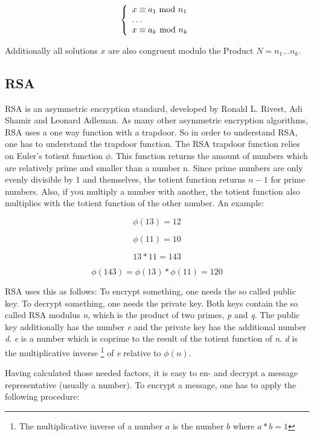 $$
\left\{
\begin{array}{l l l}
  x \equiv a_1 \ \text{mod}\ n_1 \\
  \ldots \\
  x \equiv a_k \ \text{mod}\ n_k
\end{array}
\right.
$$

Additionally all solutions $x$ are also congruent modulo the Product $N = n_1 \ldots n_k$.

\cite{ding1996chinese}

\subsection{RSA}
\label{sub_sec:rsa}
	
RSA is an asymmetric encryption standard, developed by Ronald L. Rivest, Adi Shamir and
Leonard Adleman. As many other asymmetric encryption algorithms, RSA uses a one way function
with a trapdoor. So in order to understand RSA, one has to understand the
trapdoor function. The RSA trapdoor function relies on Euler's totient function
$\phi$. This function returns the amount of numbers which are relatively prime
and smaller than a number n. Since prime numbers are only evenly divisible by
1 and themselves, the totient function returns $n - 1$ for prime numbers. Also,
if you multiply a number with another, the totient function also multiplies
with the totient function of the other number. An example:

$$\phi(13) = 12$$

$$\phi(11) = 10$$

$$13 * 11 = 143$$

$$\phi(143) = \phi(13) * \phi(11) = 120$$

RSA uses this as follows: To encrypt something, one needs the so called
public key. To decrypt something, one needs the private key. Both keys
contain the so called RSA modulus \textit{n}, which is the product of 
two primes, \textit{p} and \textit{q}. The public key additionally has
the number \textit{e} and the private key has the additional number
\textit{d}. \textit{e} is a number which is coprime to the result of
the totient function of \textit{n}. \textit{d} is the multiplicative inverse
\footnote{The multiplicative inverse of a number $a$ is the number $b$ where $a*b = 1$} of
\textit{e} relative to $\phi(n)$.

Having calculated those needed factors, it is easy to en- and decrypt
a message representative (usually a number). To encrypt a message, one
has to apply the following procedure:

